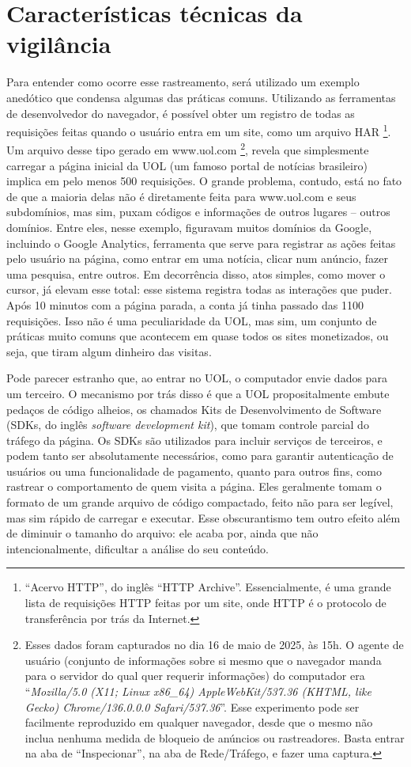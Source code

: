 \section{Características técnicas da vigilância}
Para entender como ocorre esse rastreamento, será utilizado um exemplo anedótico que condensa algumas das práticas comuns.
Utilizando as ferramentas de desenvolvedor do navegador, é possível obter um registro de todas as requisições feitas quando o usuário entra em um site, como um arquivo HAR \footnote{``Acervo HTTP'', do inglês ``HTTP Archive''. Essencialmente, é uma grande lista de requisições HTTP feitas por um site, onde HTTP é o protocolo de transferência por trás da Internet.}.
Um arquivo desse tipo gerado em www.uol.com
\footnote{Esses dados foram capturados no dia 16 de maio de 2025, às 15h. O agente de usuário (conjunto de informações sobre si mesmo que o navegador manda para o servidor do qual quer requerir informações) do computador era ``\textit{Mozilla/5.0 (X11; Linux x86\_64) AppleWebKit/537.36 (KHTML, like Gecko) Chrome/136.0.0.0 Safari/537.36}''. Esse experimento pode ser facilmente reproduzido em qualquer navegador, desde que o mesmo não inclua nenhuma medida de bloqueio de anúncios ou rastreadores. Basta entrar na aba de ``Inspecionar'', na aba de Rede/Tráfego, e fazer uma captura.}, 
revela que simplesmente carregar a página inicial da UOL (um famoso portal de notícias brasileiro) implica em pelo menos 500 requisições.
O grande problema, contudo, está no fato de que a maioria delas não é diretamente feita para www.uol.com e seus subdomínios, mas sim, puxam códigos e informações de outros lugares -- outros domínios. 
Entre eles, nesse exemplo, figuravam muitos domínios da Google, incluindo o Google Analytics, ferramenta que serve para registrar as ações feitas pelo usuário na página, como entrar em uma notícia, clicar num anúncio, fazer uma pesquisa, entre outros.
Em decorrência disso, atos simples, como mover o cursor, já elevam esse total: esse sistema registra todas as interações que puder. 
Após 10 minutos com a página parada, a conta já tinha passado das 1100 requisições.
Isso não é uma peculiaridade da UOL, mas sim, um conjunto de práticas muito comuns que acontecem em quase todos os sites monetizados, ou seja, que tiram algum dinheiro das visitas.

Pode parecer estranho que, ao entrar no UOL, o computador envie dados para um terceiro.
O mecanismo por trás disso é que a UOL propositalmente embute pedaços de código alheios, os chamados Kits de Desenvolvimento de Software (SDKs, do inglês \textit{software development kit}), que tomam controle parcial do tráfego da página.
Os SDKs são utilizados para incluir serviços de terceiros, e podem tanto ser absolutamente necessários, como para garantir autenticação de usuários ou uma funcionalidade de pagamento, quanto para outros fins, como rastrear o comportamento de quem visita a página.
Eles geralmente tomam o formato de um grande arquivo de código compactado, feito não para ser legível, mas sim rápido de carregar e executar.
Esse obscurantismo tem outro efeito além de diminuir o tamanho do arquivo: ele acaba por, ainda que não intencionalmente, dificultar a análise do seu conteúdo.

